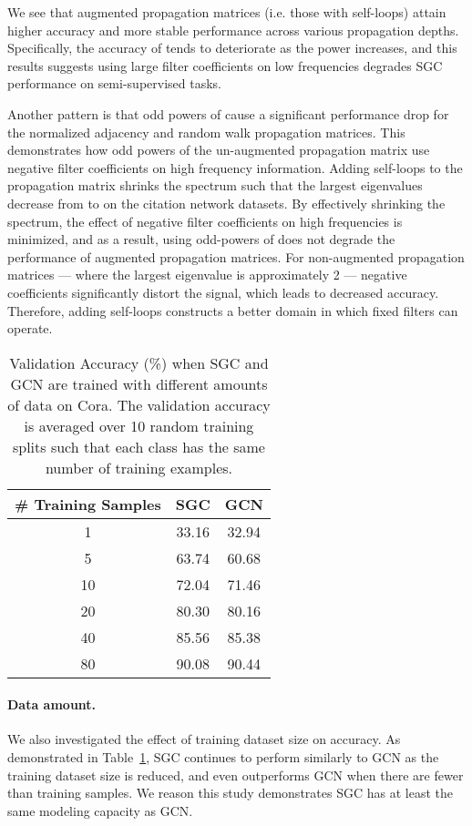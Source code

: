 \documentclass{article}
\newcommand{\method}{SGC}
\begin{document}
We see that augmented propagation matrices (i.e. those with self-loops) attain higher accuracy and more stable performance across various propagation depths. Specifically, the accuracy of  tends to deteriorate as the power  increases, and this results suggests using large filter coefficients on low frequencies degrades \method{} performance on semi-supervised tasks.

Another pattern is that odd powers of  cause a significant performance drop for the normalized adjacency and random walk propagation matrices. This demonstrates how odd powers of the un-augmented propagation matrix use negative filter coefficients on high frequency information. Adding self-loops to the propagation matrix shrinks the spectrum such that the largest eigenvalues decrease from  to  on the citation network datasets. By effectively shrinking the spectrum, the effect of negative filter coefficients on high frequencies is minimized, and as a result, using odd-powers of  does not degrade the performance of augmented propagation matrices. For non-augmented propagation matrices --- where the largest eigenvalue is approximately 2 --- negative coefficients significantly distort the signal, which leads to decreased accuracy. Therefore, adding self-loops constructs a better domain in which fixed filters can operate. 

\begin{table}[h]
    \centering
    \begin{tabular}{c|cc}
    \toprule
    \# Training Samples & \method{} & GCN \\
    \midrule
    1 & 33.16 & 32.94 \\
    5 & 63.74 & 60.68 \\
    10 & 72.04 & 71.46 \\
    20 & 80.30 & 80.16 \\
    40 & 85.56 & 85.38 \\
    80 & 90.08 & 90.44 \\
    \bottomrule
    \end{tabular}
    \caption{Validation Accuracy (\%) when \method{} and GCN are trained with different amounts of data on Cora. The validation accuracy is averaged over 10 random training splits such that each class has the same number of training examples.} 
    \label{tab:data_ablation}
\end{table}

\paragraph{Data amount.}
We also investigated the effect of training dataset size on accuracy. 
As demonstrated in Table~\ref{tab:data_ablation}, \method{} continues to perform similarly to GCN as the training dataset size is reduced, and even outperforms GCN when there are fewer than  training samples. We reason this study demonstrates \method{} has at least the same modeling capacity as GCN.
 
\end{document}
